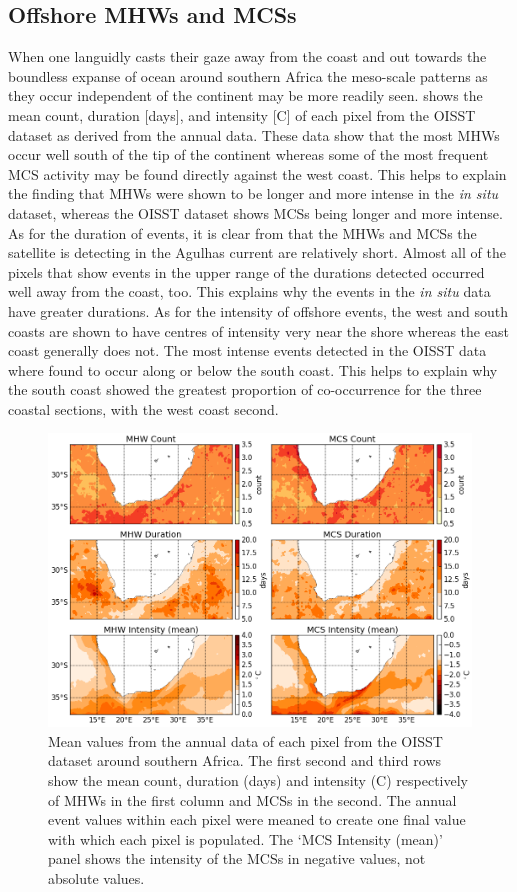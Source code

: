 \documentclass[a4paper,10pt,review]{elsarticle}
\begin{document}
\subsection{Offshore MHWs and MCSs}
When one languidly casts their gaze away from the coast and out towards the boundless expanse of ocean around southern Africa the meso-scale patterns as they occur independent of the continent may be more readily seen.  shows the mean count, duration [days], and intensity [\degree C] of each pixel from the OISST dataset as derived from the annual data. These data show that the most MHWs occur well south of the tip of the continent whereas some of the most frequent MCS activity may be found directly against the west coast. This helps to explain the finding that MHWs were shown to be longer and more intense in the \emph{in situ} dataset, whereas the OISST dataset shows MCSs being longer and more intense. As for the duration of events, it is clear from  that the MHWs and MCSs the satellite is detecting in the Agulhas current are relatively short. Almost all of the pixels that show events in the upper range of the durations detected occurred well away from the coast, too. This explains why the events in the \emph{in situ} data have greater durations. As for the intensity of offshore events, the west and south coasts are shown to have centres of intensity very near the shore whereas the east coast generally does not. The most intense events detected in the OISST data where found to occur along or below the south coast. This helps to explain why the south coast showed the greatest proportion of co-occurrence for the three coastal sections, with the west coast second.

\begin{figure}
\centering \includegraphics[width=1.0\textwidth]{MHW_MCS_mean.png}
\caption{Mean values from the annual data of each pixel from the OISST dataset around southern Africa. The first second and third rows show the mean count, duration (days) and intensity (\degree C) respectively of MHWs in the first column and MCSs in the second. The annual event values within each pixel were meaned to create one final value with which each pixel is populated. The `MCS Intensity (mean)' panel shows the intensity of the MCSs in negative values, not absolute values.}
\label{fig:Figure6}
\end{figure}
\end{document}

